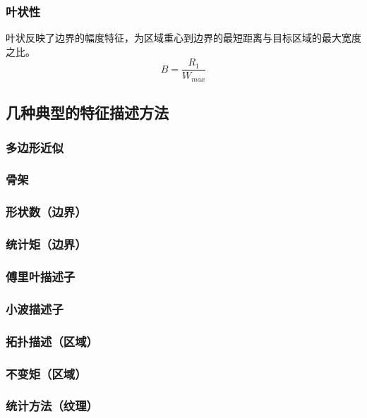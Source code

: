 \subsubsection{叶状性}
叶状反映了边界的幅度特征，为区域重心到边界的最短距离与目标区域的最大宽度之比。
    \begin{displaymath}
    B=\frac{R_{1}}{W_{max}}
    \end{displaymath}
    
\subsection{几种典型的特征描述方法}

\subsubsection{多边形近似}

\subsubsection{骨架}

\subsubsection{形状数（边界）}

\subsubsection{统计矩（边界）}

\subsubsection{傅里叶描述子}

\subsubsection{小波描述子}

\subsubsection{拓扑描述（区域）}

\subsubsection{不变矩（区域）}

\subsubsection{统计方法（纹理）}

